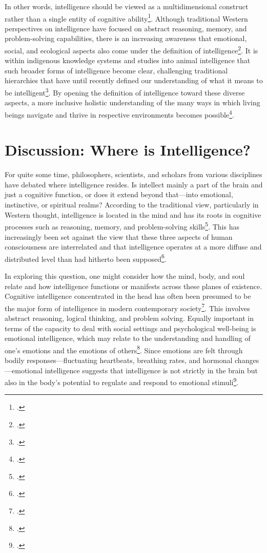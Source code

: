 \documentclass[12pt]{article}
\begin{document}
In other words, intelligence should be viewed as a multidimensional construct rather than a single entity of cognitive ability\footcite{gardner1999intelligence}. Although traditional Western perspectives on intelligence have focused on abstract reasoning, memory, and problem-solving capabilities, there is an increasing awareness that emotional, social, and ecological aspects also come under the definition of intelligence\footcite{goleman1995emotional}. It is within indigenous knowledge systems and studies into animal intelligence that such broader forms of intelligence become clear, challenging traditional hierarchies that have until recently defined our understanding of what it means to be intelligent\footcite{dewaal2016are}. By opening the definition of intelligence toward these diverse aspects, a more inclusive holistic understanding of the many ways in which living beings navigate and thrive in respective environments becomes possible\footcite{berkes2012sacred}.

\newpage

\section{Discussion: Where is Intelligence?}

For quite some time, philosophers, scientists, and scholars from various disciplines have debated where intelligence resides. Is intellect mainly a part of the brain and just a cognitive function, or does it extend beyond that—into emotional, instinctive, or spiritual realms? According to the traditional view, particularly in Western thought, intelligence is located in the mind and has its roots in cognitive processes such as reasoning, memory, and problem-solving skills\footcite{sternberg2004wisdom}. This has increasingly been set against the view that these three aspects of human consciousness are interrelated and that intelligence operates at a more diffuse and distributed level than had hitherto been supposed\footcite{gardner1999intelligence}.

In exploring this question, one might consider how the mind, body, and soul relate and how intelligence functions or manifests across these planes of existence. Cognitive intelligence concentrated in the head has often been presumed to be the major form of intelligence in modern contemporary society\footcite{sternberg2004wisdom}. This involves abstract reasoning, logical thinking, and problem solving. Equally important in terms of the capacity to deal with social settings and psychological well-being is emotional intelligence, which may relate to the understanding and handling of one's emotions and the emotions of others\footcite{goleman1995emotional}. Since emotions are felt through bodily responses—fluctuating heartbeats, breathing rates, and hormonal changes—emotional intelligence suggests that intelligence is not strictly in the brain but also in the body's potential to regulate and respond to emotional stimuli\footcite{goleman1995emotional}.
\end{document}
